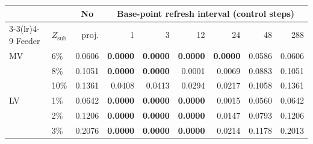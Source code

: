 \begin{tabular}{llrrrrrrr}
\toprule
&& \multicolumn{1}{c}{No} & \multicolumn{6}{c}{Base-point refresh interval (control steps)} \\
\cmidrule(lr){3-3}\cmidrule(lr){4-9}
Feeder & $Z_{\mathrm{sub}}$ & proj. & 1 & 3 & 12 & 24 & 48 & 288 \\
\midrule
MV & 6\% & 0.0606 & \textbf{0.0000} & \textbf{0.0000} & \textbf{0.0000} & \textbf{0.0000} & 0.0586 & 0.0606 \\
 & 8\% & 0.1051 & \textbf{0.0000} & \textbf{0.0000} & 0.0001 & 0.0069 & 0.0883 & 0.1051 \\
 & 10\% & 0.1361 & 0.0408 & 0.0413 & 0.0294 & 0.0217 & 0.1058 & 0.1361 \\
\midrule
LV & 1\% & 0.0642 & \textbf{0.0000} & \textbf{0.0000} & \textbf{0.0000} & 0.0015 & 0.0560 & 0.0642 \\
 & 2\% & 0.1206 & \textbf{0.0000} & \textbf{0.0000} & \textbf{0.0000} & 0.0147 & 0.0793 & 0.1206 \\
 & 3\% & 0.2076 & \textbf{0.0000} & \textbf{0.0000} & \textbf{0.0000} & 0.0214 & 0.1178 & 0.2013 \\
\bottomrule
\end{tabular}
